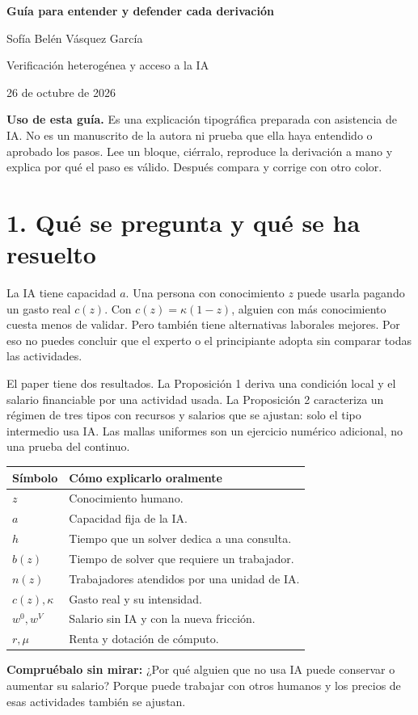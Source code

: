 \documentclass[11pt]{article}
\newcommand{\pregunta}[1]{\medskip\textbf{Compruébalo sin mirar:} #1\par}
\begin{document}
\begin{center}{\Large\bfseries Guía para entender y defender cada derivación}\par
Sofía Belén Vásquez García\par
Verificación heterogénea y acceso a la IA\par
26 de octubre de 2026
\end{center}
\textbf{Uso de esta guía.} Es una explicación tipográfica preparada con asistencia de IA. No es un manuscrito de la autora ni prueba que ella haya entendido o aprobado los pasos. Lee un bloque, ciérralo, reproduce la derivación a mano y explica por qué el paso es válido. Después compara y corrige con otro color.
\section*{1. Qué se pregunta y qué se ha resuelto}
La IA tiene capacidad $a$. Una persona con conocimiento $z$ puede usarla pagando un gasto real $c(z)$. Con $c(z)=\kappa(1-z)$, alguien con más conocimiento cuesta menos de validar. Pero también tiene alternativas laborales mejores. Por eso no puedes concluir que el experto o el principiante adopta sin comparar todas las actividades.

El paper tiene dos resultados. La Proposición 1 deriva una condición local y el salario financiable por una actividad usada. La Proposición 2 caracteriza un régimen de tres tipos con recursos y salarios que se ajustan: solo el tipo intermedio usa IA. Las mallas uniformes son un ejercicio numérico adicional, no una prueba del continuo.
\begin{center}\begin{tabular}{ll}\toprule
Símbolo & Cómo explicarlo oralmente\\\midrule
$z$ & Conocimiento humano.\\
$a$ & Capacidad fija de la IA.\\
$h$ & Tiempo que un solver dedica a una consulta.\\
$b(z)$ & Tiempo de solver que requiere un trabajador.\\
$n(z)$ & Trabajadores atendidos por una unidad de IA.\\
$c(z),\kappa$ & Gasto real y su intensidad.\\
$w^0,w^V$ & Salario sin IA y con la nueva fricción.\\
$r,\mu$ & Renta y dotación de cómputo.\\\bottomrule
\end{tabular}\end{center}
\pregunta{¿Por qué alguien que no usa IA puede conservar o aumentar su salario? Porque puede trabajar con otros humanos y los precios de esas actividades también se ajustan.}
\newpage
\end{document}
